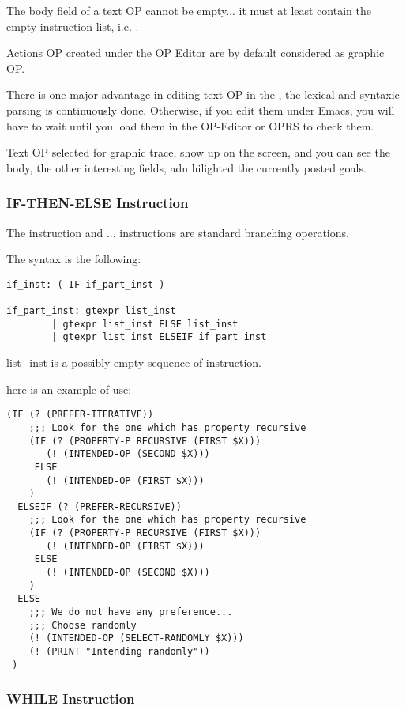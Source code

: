 The body field of a text OP cannot be empty... it must at least contain the
empty instruction list, i.e. \code{()}.

Actions OP created under the OP Editor are by default considered as graphic OP.

There is one major advantage in editing text OP in the \OPE{}, the lexical and
syntaxic parsing is continuously done.  Otherwise, if you edit them under
Emacs, you will have to wait until you load them in the OP-Editor or OPRS to
check them.

Text OP selected for graphic trace, show up on the screen, and you can see the
body, the other interesting fields, adn hilighted the currently posted goals.

\subsubsection{IF-THEN-ELSE Instruction}

The  instruction and ...  instructions
are standard branching operations.

The syntax is the following:
\begin{verbatim}
if_inst: ( IF if_part_inst )

if_part_inst: gtexpr list_inst
        | gtexpr list_inst ELSE list_inst
        | gtexpr list_inst ELSEIF if_part_inst
\end{verbatim}

list\_inst is a possibly empty sequence of instruction.

here is an example of use:
\begin{verbatim}
(IF (? (PREFER-ITERATIVE))
    ;;; Look for the one which has property recursive
    (IF (? (PROPERTY-P RECURSIVE (FIRST $X)))
       (! (INTENDED-OP (SECOND $X)))
     ELSE
       (! (INTENDED-OP (FIRST $X)))
    )
  ELSEIF (? (PREFER-RECURSIVE))
    ;;; Look for the one which has property recursive
    (IF (? (PROPERTY-P RECURSIVE (FIRST $X)))
       (! (INTENDED-OP (FIRST $X)))
     ELSE
       (! (INTENDED-OP (SECOND $X)))
    )
  ELSE
    ;;; We do not have any preference... 
    ;;; Choose randomly
    (! (INTENDED-OP (SELECT-RANDOMLY $X)))
    (! (PRINT "Intending randomly"))
 )
\end{verbatim}

\subsubsection{WHILE Instruction}


